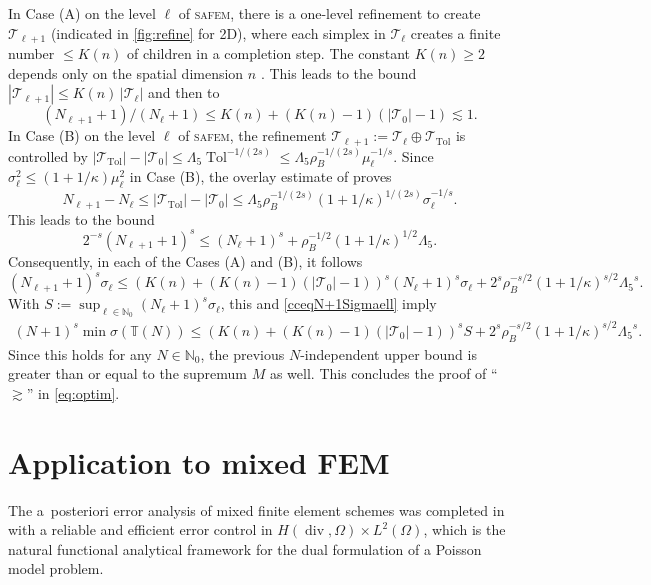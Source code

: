 \documentclass{siamltex1213}
\begin{document}
In Case (A) on the level $\ell$ of  {\textsc{safem}\xspace}, there is a one-level refinement to create ${\mathcal{T}}_{\ell+1}$
(indicated in  \cref{fig:refine} for 2D), where each simplex in ${\mathcal{T}}_{\ell}$ creates a finite number $\le K(n)$ of children in a completion step. The constant $K(n)\ge 2$ depends only 
on the spatial dimension   $n$ \cite{GSStevcmam}. This leads to the bound 
$|{\mathcal{T}}_{\ell+1}|\le K(n)\, |{\mathcal{T}}_{\ell}| $ and then to
\[
(N_{\ell+1}+1)/(N_{\ell}+1)\le  K(n)+ (K(n)-1)(|{\mathcal{T}}_0|-1)\lesssim 1.
\]
In Case (B) on the level $\ell$ of  {\textsc{safem}\xspace}, the refinement ${\mathcal{T}}_{\ell+1}:={\mathcal{T}}_{\ell}\oplus {\mathcal{T}}_\operatorname{Tol}$
is controlled by $|{\mathcal{T}}_\operatorname{Tol}|-|{\mathcal{T}}_0|\le {\ensuremath{\Lambda_{\mathrm{5}}}} \operatorname{Tol}^{-1/(2s)}\le  {\ensuremath{\Lambda_{\mathrm{5}}}}\rho_B^{-1/(2s)}
\mu_{\ell}^{-1/s}$. Since  $\sigma_\ell^2\le (1+1/\kappa)\mu_{\ell}^2$ in Case (B), 
the overlay estimate
of \cite{CKNS07,Stev07} proves
\[
N_{\ell+1}-N_\ell\le |{\mathcal{T}}_\operatorname{Tol}|-|{\mathcal{T}}_0|\le {\ensuremath{\Lambda_{\mathrm{5}}}}\rho_B^{-1/(2s)} (1+1/\kappa)^{1/(2s)}
\sigma_{\ell}^{-1/s}.
\]
This leads to the bound 
\[
2^{-s}(N_{\ell+1}+1)^s\le (N_\ell+1)^s + \rho_B^{-1/2} (1+1/\kappa)^{1/2} {\ensuremath{\Lambda_{\mathrm{5}}}}.
\]
Consequently, in each of the  Cases (A) and (B), it follows 
\[
(N_{\ell+1}+1)^s\sigma_\ell\le   \left(K(n)+ (K(n)-1)(|{\mathcal{T}}_0|-1)\right)^s  (N_{\ell}+1)^{s}\sigma_\ell
+2^{s}\rho_B^{-s/2} (1+1/\kappa)^{s/2}{\ensuremath{\Lambda_{\mathrm{5}}}}^s.
\]
With $S:= \sup_{\ell \in {\mathbb{N}_0}}\left(N_{\ell}+1 \right)^{s}  \sigma_\ell$, this and   \eqref{cceqN+1Sigmaell} 
imply 
\begin{align*}
(N+1)^s\min\sigma({\mathbb T\left(N\right)})\le  \left(K(n)+ (K(n)-1)(|{\mathcal{T}}_0|-1)\right)^s S + 
2^{s}\rho_B^{-s/2} (1+1/\kappa)^{s/2}{\ensuremath{\Lambda_{\mathrm{5}}}}^s.
\end{align*}
Since this holds for any $N\in{\mathbb{N}_0}$, the previous $N$-independent upper bound is greater than or equal to 
the supremum $M$ as well. This concludes the proof of ``$\gtrsim$''  in \eqref{eq:optim}.
\endproof

\section{Application to mixed FEM}
\label{s:applmfem}
The a~posteriori error analysis of mixed finite element schemes \cite{CC-MC-97,Alonso96} was completed in  \cite{ccdpas2015} with a reliable and efficient error control in  $H(\operatorname{div},\Omega)\times L^2(\Omega)$,
which is the natural functional analytical framework for the dual formulation of a Poisson model problem.
\end{document}
